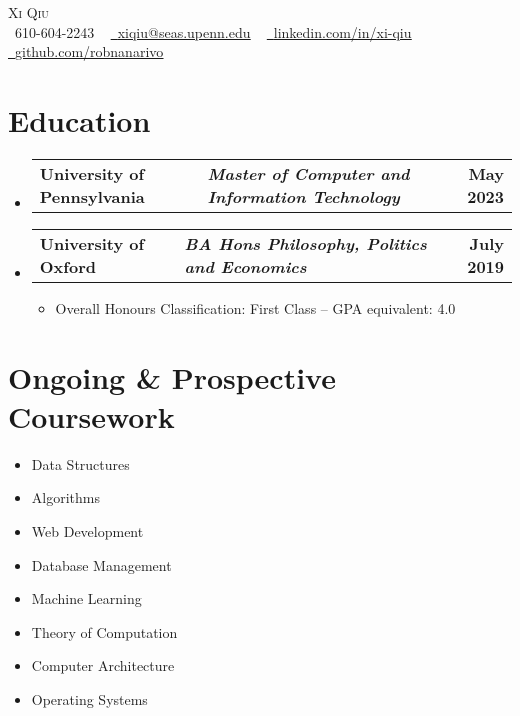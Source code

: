 \documentclass[11pt,a4paper,extrafontsizes,twoside]{memoir}
\makeatletter
\newcommand{\resumeItem}[1]{
  \item\small{
    {#1 \vspace{-2pt}}
  }
}
\newcommand{\resumeSubheading}[3]{
  \vspace{-2pt}\item
    \begin{tabular*}{1.0\textwidth}[t]{p{7.5cm} p{8cm} @{\extracolsep{\fill}} r}
      \textbf{#1} & \textbf{\textit{\small#3}} & \textbf{\footnotesize #2} \\
    \end{tabular*}\vspace{-7pt}
}
\newcommand{\resumeSubHeadingListStart}{\begin{itemize}[leftmargin=0.0in, label={}]}
\newcommand{\resumeSubHeadingListEnd}{\end{itemize}}
\newcommand{\resumeItemListStart}{\begin{itemize}}
\newcommand{\resumeItemListEnd}{\end{itemize}\vspace{-5pt}}
\makeatother
\begin{document}
\begin{center}
    {\Huge \scshape Xi Qiu} \\ \vspace{10pt}
    \small \raisebox{-0.1\height}\faPhone\ 610-604-2243 ~ \href{mailto:xiqiu@seas.upenn.edu}{\raisebox{-0.2\height}\faEnvelope\  \underline{xiqiu@seas.upenn.edu}} ~ 
    \href{https://linkedin.com/in/xi-qiu}{\raisebox{-0.2\height}\faLinkedin\ \underline{linkedin.com/in/xi-qiu}}  ~
    \href{https://github.com/robnanarivo}{\raisebox{-0.2\height}\faGithub\ \underline{github.com/robnanarivo}}
\end{center}


\section{Education}
  \resumeSubHeadingListStart
    \resumeSubheading
      {University of Pennsylvania}{May 2023}
      {\footnotesize Master of Computer and Information Technology}

    \vspace{-10pt}

    \resumeSubheading
      {University of Oxford}{July 2019}
      {\footnotesize BA Hons Philosophy, Politics and Economics}
      \resumeItemListStart
        \resumeItem{Overall Honours Classification: First Class -- GPA equivalent: 4.0}
    \resumeItemListEnd
  \resumeSubHeadingListEnd
  \vspace{-20pt}

\section{\small Ongoing \& Prospective Coursework}
        \begin{multicols}{4}
            \begin{itemize}[itemsep=-5pt, parsep=3pt]
                \item\footnotesize Data Structures
                \item Algorithms
                \item Web Development
                \item Database Management
                \item Machine Learning
                \item Theory of Computation
                \item Computer Architecture
                \item Operating Systems
            \end{itemize}
        \end{multicols}
        \vspace{-5pt}
\end{document}
